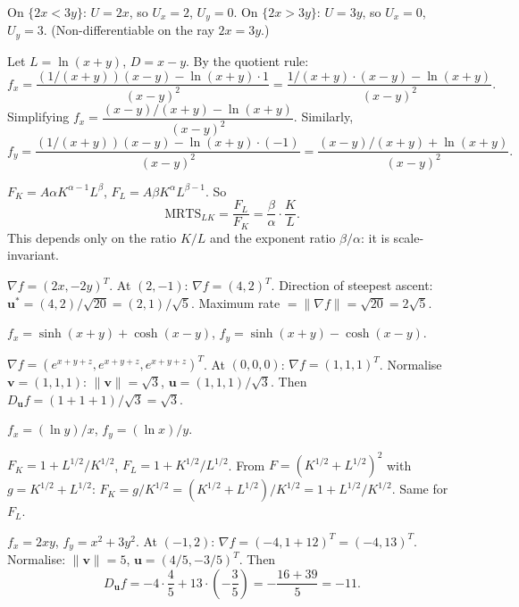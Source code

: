 \begin{solutions}
  \item On $\{2x<3y\}$: $U=2x$, so $U_x=2$, $U_y=0$. On $\{2x>3y\}$:
        $U=3y$, so $U_x=0$, $U_y=3$. (Non-differentiable on the ray
        $2x=3y$.)

  \item Let $L=\ln(x+y)$, $D=x-y$. By the quotient rule:
        \[
          f_x=\frac{(1/(x+y))(x-y)-\ln(x+y)\cdot1}{(x-y)^2}
            =\frac{1/(x+y)\cdot(x-y)-\ln(x+y)}{(x-y)^2} .
        \]
        Simplifying
        $f_x=\dfrac{(x-y)/(x+y)-\ln(x+y)}{(x-y)^2}$. Similarly,
        \[
          f_y=\frac{(1/(x+y))(x-y)-\ln(x+y)\cdot(-1)}{(x-y)^2}
            =\frac{(x-y)/(x+y)+\ln(x+y)}{(x-y)^2} .
        \]

  \item $F_K=A\alpha K^{\alpha-1}L^\beta$, $F_L=A\beta K^\alpha L^{\beta-1}$.
        So
        \[
          \mathrm{MRTS}_{LK}=\frac{F_L}{F_K}=\frac{\beta}{\alpha}\cdot
            \frac{K}{L} .
        \]
        This depends only on the ratio $K/L$ and the exponent ratio
        $\beta/\alpha$: it is scale-invariant.

  \item $\nabla f=(2x,-2y)^T$. At $(2,-1)$: $\nabla f=(4,2)^T$. Direction
        of steepest ascent: $\mathbf{u}^*=(4,2)/\sqrt{20}=(2,1)/\sqrt5$.
        Maximum rate $=\|\nabla f\|=\sqrt{20}=2\sqrt5$.

  \item $f_x=\sinh(x+y)+\cosh(x-y)$, $f_y=\sinh(x+y)-\cosh(x-y)$.

  \item $\nabla f=(e^{x+y+z},e^{x+y+z},e^{x+y+z})^T$. At $(0,0,0)$:
        $\nabla f=(1,1,1)^T$. Normalise $\mathbf{v}=(1,1,1)$:
        $\|\mathbf{v}\|=\sqrt3$, $\mathbf{u}=(1,1,1)/\sqrt3$. Then
        $D_{\mathbf{u}}f=(1+1+1)/\sqrt3=\sqrt3$.

  \item $f_x=(\ln y)/x$, $f_y=(\ln x)/y$.

  \item $F_K=1+L^{1/2}/K^{1/2}$, $F_L=1+K^{1/2}/L^{1/2}$. From
        $F=(K^{1/2}+L^{1/2})^2$ with $g=K^{1/2}+L^{1/2}$:
        $F_K=g/K^{1/2}=(K^{1/2}+L^{1/2})/K^{1/2}=1+L^{1/2}/K^{1/2}$.
        \checkmark Same for $F_L$.

  \item $f_x=2xy$, $f_y=x^2+3y^2$. At $(-1,2)$: $\nabla f=(-4,1+12)^T
        =(-4,13)^T$. Normalise: $\|\mathbf{v}\|=5$,
        $\mathbf{u}=(4/5,-3/5)^T$. Then
        \[
          D_{\mathbf{u}}f=-4\cdot\frac45+13\cdot\left(-\frac35\right)
            =-\frac{16+39}{5}=-11 .
        \]


\end{solutions}
